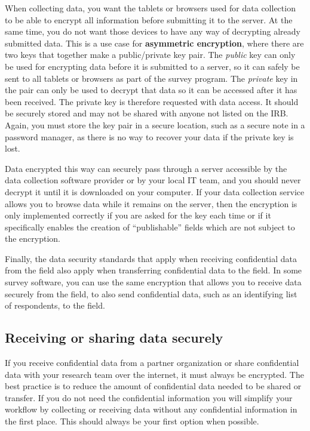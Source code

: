 When collecting data, you want the tablets or browsers used for data collection
to be able to encrypt all information before submitting it to the server.
At the same time, you do not want those devices to have any way of decrypting already submitted data.
This is a use case for \textbf{asymmetric encryption},
where there are two keys that together make a public/private key pair.
The \textit{public} key can only be used for encrypting data before it is submitted to a server,
so it can safely be sent to all tablets or browsers as part of the survey program.
The \textit{private} key in the pair can only be used to decrypt that data
so it can be accessed after it has been received.
The private key is therefore requested with data access.
It should be securely stored
and may not be shared with anyone not listed on the IRB.
Again, you must store the key pair in a secure location,
such as a secure note in a password manager,
as there is no way to recover your data if the private key is lost.

Data encrypted this way can securely pass
through a server accessible by the data collection software provider
or by your local IT team,
and you should never decrypt it until it is downloaded on your computer.
If your data collection service allows you
to browse data while it remains on the server,
then the encryption is only implemented correctly
if you are asked for the key each time
or if it specifically enables the creation of ``publishable''
fields which are not subject to the encryption.

Finally, the data security standards that apply
when receiving confidential data from the field
also apply when transferring confidential data to the field.
In some survey software,
you can use the same encryption that allows you to receive data securely
from the field, to also send confidential data,
such as an identifying list of respondents, to the field.

\subsection{Receiving or sharing data securely}

If you receive confidential data from a partner organization
or share confidential data with your research team over the internet,
it must always be encrypted.
The best practice is to reduce the amount of confidential data
needed to be shared or transfer.
If you do not need the confidential information you will simplify your workflow
by collecting or receiving data without any confidential information in the first place.
This should always be your first option when possible.

